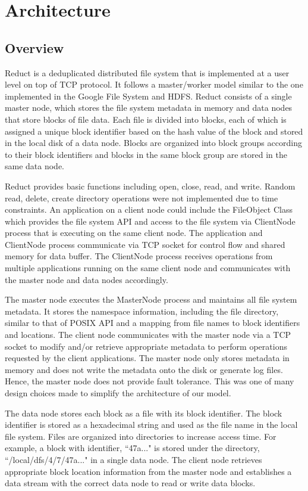 \documentclass[11pt,twocolumn]{article}
\begin{document}
\section {Architecture}\label{arch}

\subsection{Overview}\label{arch:overview}
Reduct is a deduplicated distributed file system that is implemented at a user level on top of TCP protocol. It follows a master/worker model similar to the one implemented in the Google File System and HDFS. Reduct consists of a single master node, which stores the file system metadata in memory and data nodes that store blocks of file data. Each file is divided into blocks, each of which is assigned a unique block identifier based on the hash value of the block and stored in the local disk of a data node. Blocks are organized into block groups according to their block identifiers and blocks in the same block group are stored in the same data node.

Reduct provides basic functions including open, close, read, and write. Random read, delete, create directory operations were not implemented due to time constraints. An application on a client node could include the FileObject Class which provides the file system API and access to the file system via ClientNode process that is executing on the same client node. The application and ClientNode process communicate via TCP socket for control flow and shared memory for data buffer. The ClientNode process receives operations from multiple applications running on the same client node and communicates with the master node and data nodes accordingly. 

The master node executes the MasterNode process and maintains all file system metadata. It stores the namespace information, including the file directory, similar to that of POSIX API and a mapping from file names to block identifiers and locations. The client node communicates with the master node via a TCP socket to modify and/or retrieve appropriate metadata to perform operations requested by the client applications. The master node only stores metadata in memory and does not write the metadata onto the disk or generate log files. Hence, the master node does not provide fault tolerance. This was one of many design choices made to simplify the architecture of our model. 

The data node stores each block as a file with its block identifier. The block identifier is stored as a hexadecimal string and used as the file name in the local file system. Files are organized into directories to increase access time. For example, a block with identifier, ``47a..." is stored under the directory, ``/local/dfs/4/7/47a..." in a single data node. The client node retrieves appropriate block location information from the master node and establishes a data stream with the correct data node to read or write data blocks.
\end{document}
